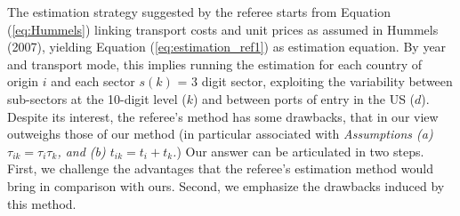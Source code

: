 \documentclass[a4paper,11pt]{article}
\begin{document}
The estimation strategy suggested by the referee starts from Equation (\ref{eq:Hummels}) linking transport costs and unit prices as assumed in Hummels (2007), yielding Equation (\ref{eq:estimation_ref1}) as estimation equation. By year and transport mode, this implies running the estimation for each country of origin $i$ and each sector $s(k)$ = 3 digit sector, exploiting the variability between sub-sectors at the 10-digit level ($k$) and between ports of entry in the US ($d$). Despite its interest, the referee's method has some drawbacks, that in our view outweighs those of our method (in particular associated with \textit{Assumptions (a) $\tau_{ik} = \tau_i\tau_{k}$, and (b) $t_{ik} = t_i+ t_{k}$.}) Our answer can be articulated in two steps. First, we challenge the advantages that the referee's estimation method would bring in comparison with ours. Second, we emphasize the drawbacks induced by this method. \smallskip
%
%
%
%
\end{document}
